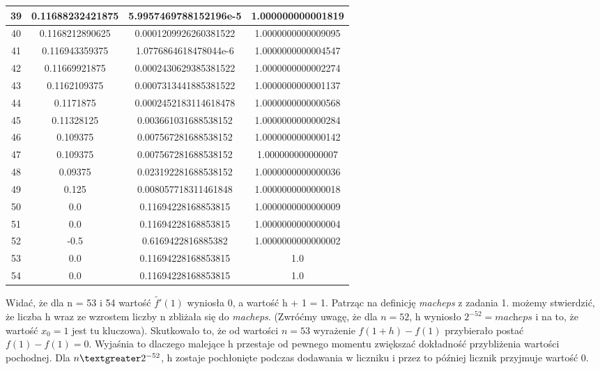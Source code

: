 \documentclass[]{article}
\begin{document}
\begin{table}[!h]
\begin{tabular}{|c|c|c|c|}
			39 & 0.11688232421875 & 5.9957469788152196e-5 & 1.000000000001819\\ \hline
			40 & 0.1168212890625 & 0.0001209926260381522 & 1.0000000000009095\\ \hline
			41 & 0.116943359375 & 1.0776864618478044e-6 & 1.0000000000004547\\ \hline
			42 & 0.11669921875 & 0.0002430629385381522 & 1.0000000000002274\\ \hline
			43 & 0.1162109375 & 0.0007313441885381522 & 1.0000000000001137\\ \hline
			44 & 0.1171875 & 0.0002452183114618478 & 1.0000000000000568\\ \hline
			45 & 0.11328125 & 0.003661031688538152 & 1.0000000000000284\\ \hline
			46 & 0.109375 & 0.007567281688538152 & 1.0000000000000142\\ \hline
			47 & 0.109375 & 0.007567281688538152 & 1.000000000000007\\ \hline
			48 & 0.09375 & 0.023192281688538152 & 1.0000000000000036\\ \hline
			49 & 0.125 & 0.008057718311461848 & 1.0000000000000018\\ \hline
			50 & 0.0 & 0.11694228168853815 & 1.0000000000000009\\ \hline
			51 & 0.0 & 0.11694228168853815 & 1.0000000000000004\\ \hline
			52 & -0.5 & 0.6169422816885382 & 1.0000000000000002\\ \hline
			53 & 0.0 & 0.11694228168853815 & 1.0\\ \hline
			54 & 0.0 & 0.11694228168853815 & 1.0\\ \hline
		\end{tabular}
	\end{table}
	
	Widać, że dla n = 53 i 54 wartość $\widetilde{f'}(1)$ wyniosła 0, a wartość h + 1 = 1. Patrząc na definicję \textit{macheps} z zadania 1. możemy stwierdzić, że liczba h wraz ze wzrostem liczby n zbliżała się do \textit{macheps}. (Zwróćmy uwagę, że dla $n = 52$, h wyniosło $2^{-52} = \textit{macheps}$ i na to, że wartość $x_0 = 1$ jest tu kluczowa). Skutkowało to, że od wartości $n = 53$ wyrażenie $f(1 + h) - f(1)$ przybierało postać $f(1) - f(1) = 0$. Wyjaśnia to dlaczego malejące h przestaje od pewnego momentu zwiększać dokładność przybliżenia wartości pochodnej. Dla $n\space \textgreater\space 2^{-52}$, h zostaje pochłonięte podczas dodawania w liczniku i przez to później licznik przyjmuje wartość 0.
	
	
	
	
\end{document}
